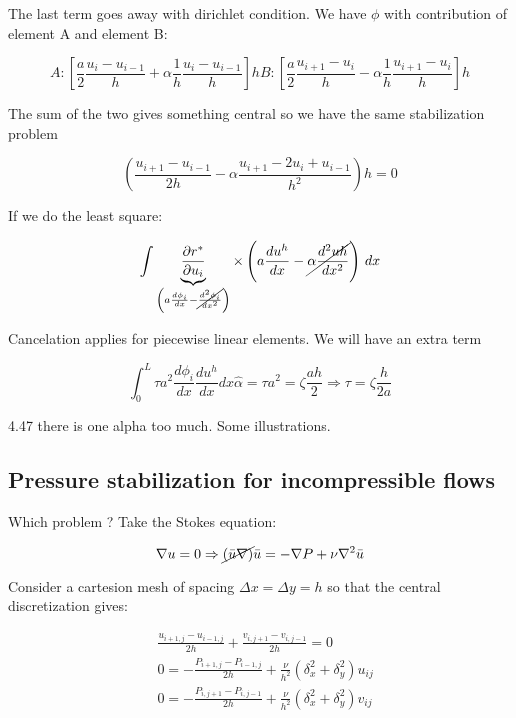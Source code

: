 The last term goes away with dirichlet condition. We have $\phi$ with contribution of element A and element B: 

\begin{equation}
A: [\frac{a}{2}\frac{u_i - u_{i-1}}{h}+\alpha \frac{1}{h} \frac{u_i - u_{i-1}}{h}]h
B: [\frac{a}{2}\frac{u_{i+1} - u_{i}}{h}-\alpha \frac{1}{h} \frac{u_{i+1} - u_{i}}{h}]h
\end{equation}

The sum of the two gives something central so we have the same stabilization problem

\begin{equation}
\left(\frac{u_{i+1}-u_{i-1}}{2h}-\alpha \frac{u_{i+1}-2u_i+u_{i-1}}{h^2} \right)h = 0
\end{equation}

If we do the least square: 

\begin{equation}
\int \underbrace{\frac{\partial r^*}{\partial u_i}}_{\left( a\frac{d\phi _i}{dx} - \cancel{\frac{d^2\phi _i}{dx^2}} \right)}\times \left( a\frac{du^h}{dx}-\cancel{\alpha \frac{d^2uh}{dx^2} }\right) \, dx
\end{equation}

Cancelation applies for piecewise linear elements. We will have an extra term 

\begin{equation}
\int _0 ^L \tau a^2 \frac{d\phi _i}{dx}\frac{du^h}{dx}dx
\hat{\alpha} = \tau a^2 = \zeta \frac{ah}{2} \Rightarrow \tau = \zeta \frac{h}{2a}
\end{equation}

4.47 there is one alpha too much. Some illustrations. 

\subsection{Pressure stabilization for incompressible flows}
Which problem ? Take the Stokes equation: 

\begin{equation}
\nabla u = 0 \Rightarrow \cancel{(\bar{u} \nabla)} \bar{u}= - \nabla P + \nu \nabla ^2 \bar{u}
\end{equation}

Consider a cartesion mesh of spacing $\Delta x = \Delta y = h$ so that the central discretization gives: 

\begin{equation}
\begin{aligned}
&\frac{u_{i+1,j}-u_{i-1,j}}{2h}+ \frac{v_{i,j + 1}-v_{i,j-1}}{2h} = 0 \\
&0 = - \frac{P_{i+1,j} - P_{i-1,j}}{2h}+ \frac{\nu}{h^2}(\delta _x^2+ \delta _y^2)u_{ij}\\
&0 = - \frac{P_{i,j+1} - P_{i,j-1}}{2h}+ \frac{\nu}{h^2}(\delta _x^2+ \delta _y^2)v_{ij}
\end{aligned}
\end{equation}

